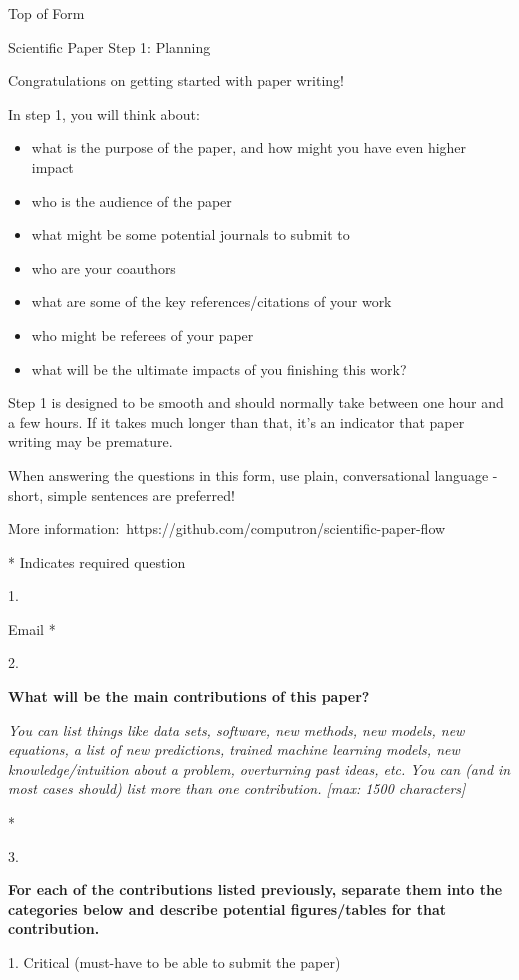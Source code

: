 \documentclass[]{article}
\date{}
\begin{document}
Top of Form

Scientific Paper Step 1: Planning

Congratulations on getting started with paper writing!

In step 1, you will think about:

\begin{itemize}
\item
  what is the purpose of the paper, and how might you have even higher
  impact
\item
  who is the audience of the paper
\item
  what might be some potential journals to submit to
\item
  who are your coauthors
\item
  what are some of the key references/citations of your work
\item
  who might be referees of your paper
\item
  what will be the ultimate impacts of you finishing this work?
\end{itemize}

Step 1 is designed to be smooth and should normally take between one
hour and a few hours. If it takes much longer than that, it's an
indicator that paper writing may be premature.

When answering the questions in this form, use plain, conversational
language - short, simple sentences are preferred!

More information:~https://github.com/computron/scientific-paper-flow

* Indicates required question

1.

Email *

2.

\textbf{What will be the main contributions of this paper?}

\emph{You can list things like data sets, software, new methods, new
models, new equations, a list of new predictions, trained machine
learning models, new knowledge/intuition about a problem, overturning
past ideas, etc. You can (and in most cases should) list more than one
contribution. {[}max: 1500 characters{]}}

*

3.

\textbf{For each of the contributions listed previously, separate them
into the categories below and describe potential figures/tables for that
contribution.}

1. Critical (must-have to be able to submit the paper)
\end{document}
